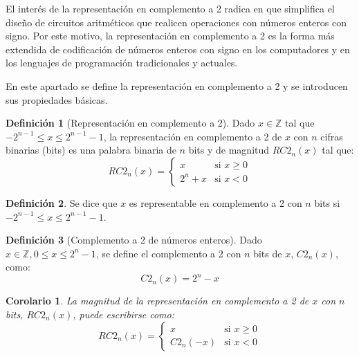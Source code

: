 \documentclass[spanish,a4paper,12pt,titlepage]{article}
\newtheorem{corollary}[theorem]{Corolario}
\theoremstyle{definition}
\newtheorem{definition}{Definición}%
\theoremstyle{remark}
\newcommand{\bbZ}{\mathbb{Z}}
\begin{document}
El interés de la representación en complemento a 2 radica en que simplifica el diseño de circuitos aritméticos que realicen operaciones con números enteros con signo. Por este motivo, la representación en complemento a 2 es la forma más extendida de codificación de números enteros con signo en los computadores y en los lenguajes de programación tradicionales y actuales.

En este apartado se define la representación en complemento a 2 y se introducen sus propiedades básicas.

\begin{definition}[Representación en complemento a 2]\label{def-rep-ca2}
    Dado $x \in \bbZ$ tal que $-2^{n-1} \le x \le 2^{n-1}-1$, la representación en complemento a 2 de $x$ con $n$ cifras binarias (bits) es una palabra binaria de $n$ bits y de magnitud $RC2_n(x)$ tal que:
    \[
        RC2_n(x) =
            \begin{cases}
                x     & \text{si } x \ge 0\\
                2^n+x & \text{si } x < 0
            \end{cases}
    \]
\end{definition}

\begin{definition}\label{def-rep-ca2_rep}
    Se dice que $x$ es representable en complemento a 2 con $n$ bits si $-2^{n-1} \le x \le 2^{n-1}-1$.
\end{definition}

\begin{definition}[Complemento a 2 de números enteros]
    Dado $x \in \bbZ, 0 \le x \le 2^n-1$, se define el complemento a 2 con $n$ bits de $x$, $C2_n(x)$, como:
    \[
        C2_n(x) = 2^n - x
    \]
\end{definition}

\begin{corollary}
    La magnitud de la representación en complemento a 2 de $x$ con $n$ bits, $RC2_n(x)$, puede escribirse como:
    \[
        RC2_n(x) = \begin{cases}
            x        & \text{si } x \ge 0\\
            C2_n(-x) & \text{si } x < 0
        \end{cases}
    \]
\end{corollary}
\end{document}
